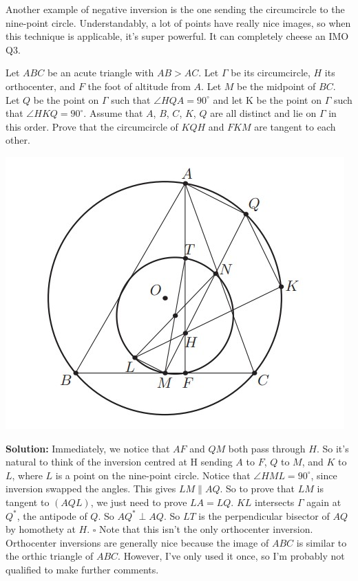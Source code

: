 \documentclass{scrartcl}
\begin{document}
Another example of negative inversion is the one sending the circumcircle to the nine-point circle. Understandably, a lot of points have really nice images, so when this technique is applicable, it's super powerful. It can completely cheese an IMO Q3.
\begin{problem}[IMO 2015/3] Let $ABC$ be an acute triangle with $AB>AC$. Let $\Gamma$ be its circumcircle, $H$ its orthocenter, and $F$ the foot of altitude from $A$. Let $M$ be the midpoint of $BC$. Let $Q$ be the point on $\Gamma$ such that $\angle HQA=90^{\circ}$ and let K be the point on $\Gamma$ such that $\angle HKQ=90^{\circ}$. Assume that $A$, $B$, $C$, $K$, $Q$ are all distinct and lie on $\Gamma$ in this order. Prove that the circumcircle of $KQH$ and $FKM$ are tangent to each other. 
\end{problem}
\begin{center}
    \includegraphics[scale=1]{figure836.jpg}
\end{center}
\textbf{Solution:} Immediately, we notice that $AF$ and $QM$ both pass through $H$. So it's natural to think of the inversion centred at H sending $A$ to $F$, $Q$ to $M$, and $K$ to $L$, where $L$ is a point on the nine-point circle. Notice that $\angle HML=90^{\circ}$, since inversion swapped the angles. This gives $LM \parallel AQ$. So to prove that $LM$ is tangent to $(AQL)$, we just need to prove $LA = LQ$. $KL$ intersects $\Gamma$ again at $Q^*$, the antipode of $Q$. So $AQ^* \perp AQ$. So $LT$ is the perpendicular bisector of $AQ$ by homothety at $H$. $\square$\newline
Note that this isn't the only orthocenter inversion. Orthocenter inversions are generally nice because the image of $ABC$ is similar to the orthic triangle of $ABC$. However, I've only used it once, so I'm probably not qualified to make further comments.
\end{document}
